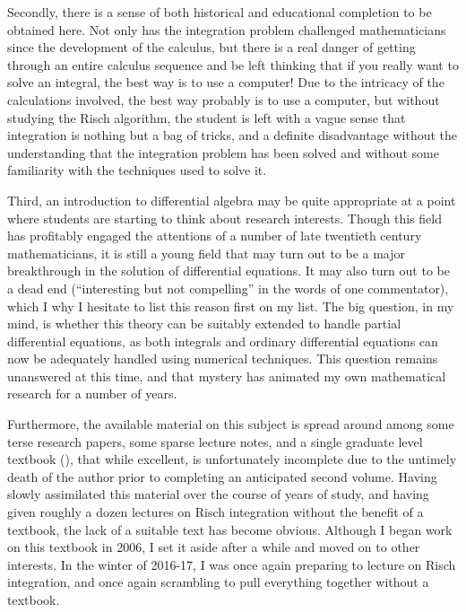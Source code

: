 Secondly, there is a sense of both historical and educational
completion to be obtained here.  Not only has the integration problem
challenged mathematicians since the development of the calculus, but
there is a real danger of getting through an entire calculus sequence
and be left thinking that if you really want to solve an integral, the
best way is to use a computer!  Due to the intricacy of the
calculations involved, the best way probably is to use a computer, but
without studying the Risch algorithm, the student is left with a vague
sense that integration is nothing but a bag of tricks, and
a definite disadvantage without
the understanding that the integration problem has been solved and
without some familiarity with the techniques used to solve it.

Third, an introduction to differential algebra may be quite
appropriate at a point where students are starting to think about
research interests.  Though this field has profitably engaged the
attentions of a number of late twentieth century mathematicians, it is
still a young field that may turn out to be a major breakthrough in
the solution of differential equations.  It may also turn out to be a
dead end (``interesting but not compelling'' in the words of one
commentator), which I why I hesitate to list this reason first on my
list.  The big question, in my mind, is whether this theory can be
suitably extended to handle partial differential equations, as both
integrals and ordinary differential equations can now be adequately
handled using numerical techniques.  This question remains unanswered
at this time, and that mystery has animated my own mathematical
research for a number of years.


Furthermore, the available material on this subject is spread around
among some terse research papers, some sparse lecture notes, and a
single graduate level textbook (\cite{bronstein book}), that while
excellent, is unfortunately incomplete due to the untimely death of
the author prior to completing an anticipated second volume.
Having
slowly assimilated this material over the course of years of study,
and having given roughly a dozen lectures on Risch integration
without the benefit of a textbook, the lack of a suitable text
has become obvious.  Although I began work on this textbook
in 2006, I set it aside after a while and moved on to other
interests.
In the winter of 2016-17, I was once again
preparing to lecture on Risch integration, and once again
scrambling to pull everything together without a textbook.

